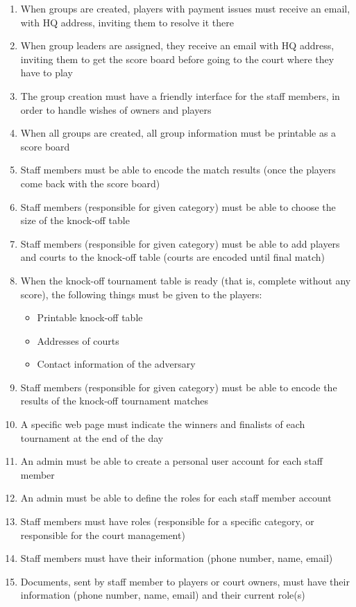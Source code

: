 \begin{enumerate}
    \item When groups are created, players with payment issues must receive an email, with HQ address, inviting them to resolve it there
    \item When group leaders are assigned, they receive an email with HQ address, inviting them to get the score board before going to the court where they have to play
    \item The group creation must have a friendly interface for the staff members, in order to handle wishes of owners and players
    \item When all groups are created, all group information must be printable as a score board
    \item Staff members must be able to encode the match results (once the players come back with the score board)
    \item Staff members (responsible for given category) must be able to choose the size of the knock-off table
    \item Staff members (responsible for given category) must be able to add players and courts to the knock-off table (courts are encoded until final match)
    \item When the knock-off tournament table is ready (that is, complete without any score), the following things must be given to the players:
    		\begin{itemize}
    			\item Printable knock-off table
    			\item Addresses of courts
    			\item Contact information of the adversary
    		\end{itemize}
    \item Staff members (responsible for given category) must be able to encode the results of the knock-off tournament matches
    \item A specific web page must indicate the winners and finalists of each tournament at the end of the day
    \item An admin must be able to create a personal user account for each staff member
    \item An admin must be able to define the roles for each staff member account
    \item Staff members must have roles (responsible for a specific category, or responsible for the court management)
    \item Staff members must have their information (phone number, name, email)
    \item Documents, sent by staff member to players or court owners, must have their information (phone number, name, email) and their current role(s)
\end{enumerate}

